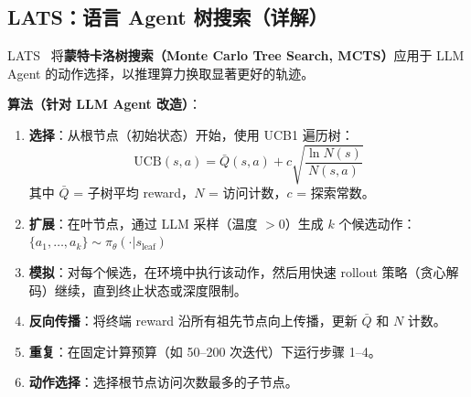 \subsection{LATS：语言 Agent 树搜索（详解）}
\label{lats-language-agent-tree-search-detailed}

LATS~\cite{zhou2024lats} 将\textbf{蒙特卡洛树搜索（Monte Carlo Tree Search, MCTS）}应用于 LLM Agent 的动作选择，以推理算力换取显著更好的轨迹。

\textbf{算法（针对 LLM Agent 改造）}：

\begin{enumerate}
  \item \textbf{选择}：从根节点（初始状态）开始，使用 UCB1 遍历树：
\begin{equation}
\text{UCB}(s, a) = \bar{Q}(s, a) + c \sqrt{\frac{\ln N(s)}{N(s, a)}}
\end{equation}
 其中 $\bar{Q}$ = 子树平均 reward，$N$ = 访问计数，$c$ = 探索常数。
  \item \textbf{扩展}：在叶节点，通过 LLM 采样（温度 $> 0$）生成 $k$ 个候选动作：$\{a_1, \ldots, a_k\} \sim \pi_\theta(\cdot | s_{\text{leaf}})$
  \item \textbf{模拟}：对每个候选，在环境中执行该动作，然后用快速 rollout 策略（贪心解码）继续，直到终止状态或深度限制。
  \item \textbf{反向传播}：将终端 reward 沿所有祖先节点向上传播，更新 $\bar{Q}$ 和 $N$ 计数。
  \item \textbf{重复}：在固定计算预算（如 50--200 次迭代）下运行步骤 1--4。
  \item \textbf{动作选择}：选择根节点访问次数最多的子节点。
\end{enumerate}

